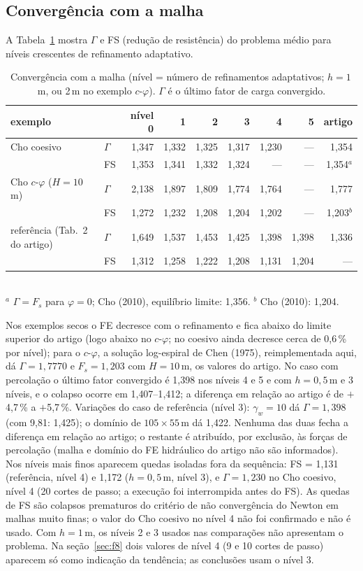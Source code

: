 \documentclass[11pt,a4paper]{article}
\newcommand{\Gam}{\Gamma}
\begin{document}
\subsection{Convergência com a malha}\label{sec:conv}
A Tabela~\ref{tab:conv} mostra $\Gam$ e FS (redução de resistência) do problema médio para níveis crescentes de refinamento adaptativo.
\begin{table}[H]\centering\small\caption{Convergência com a malha (nível = número de refinamentos adaptativos; $h = 1$\,m, ou 2\,m no exemplo $c$-$\varphi$). $\Gam$ é o último fator de carga convergido.}\label{tab:conv}
\begin{tabular}{llrrrrrrr}\toprule exemplo & & nível 0 & 1 & 2 & 3 & 4 & 5 & artigo\\\midrule
Cho coesivo & $\Gam$ & 1{,}347 & 1{,}332 & 1{,}325 & 1{,}317 & 1{,}230 & --- & 1,354\\
 & FS & 1{,}353 & 1{,}341 & 1{,}332 & 1{,}324 & --- & --- & 1,354$^a$\\
Cho $c$-$\varphi$ ($H = 10$\,m) & $\Gam$ & 2{,}138 & 1{,}897 & 1{,}809 & 1{,}774 & 1{,}764 & --- & 1,777\\
 & FS & 1{,}272 & 1{,}232 & 1{,}208 & 1{,}204 & 1{,}202 & --- & 1,203$^b$\\
referência (Tab.~2 do artigo) & $\Gam$ & 1{,}649 & 1{,}537 & 1{,}453 & 1{,}425 & 1{,}398 & 1{,}398 & 1,336\\
 & FS & 1{,}312 & 1{,}258 & 1{,}222 & 1{,}208 & 1{,}131 & 1{,}204 & ---\\
\bottomrule\end{tabular}\\[2pt]{\footnotesize $^a$ $\Gam = F_s$ para $\varphi = 0$; Cho (2010), equilíbrio limite: 1,356. $^b$ Cho (2010): 1,204.}\end{table}
Nos exemplos secos o FE decresce com o refinamento e fica abaixo do limite superior do artigo (logo abaixo no $c$-$\varphi$; no coesivo ainda decresce cerca de 0,6\,\% por nível); para o $c$-$\varphi$, a solução log-espiral de Chen (1975), reimplementada aqui, dá $\Gam = 1{,}7770$ e $F_s = 1{,}203$ com $H = 10$\,m, os valores do artigo. No caso com percolação o último fator convergido é 1{,}398 nos níveis 4 e 5 e com $h = 0{,}5$\,m e 3 níveis, e o colapso ocorre em 1{,}407--1{,}412; a diferença em relação ao artigo é de $+$4{,}7\,\% a $+$5{,}7\,\%.
Variações do caso de referência (nível 3): $\gamma_w = 10$ dá $\Gam = 1{,}398$ (com 9,81: 1{,}425); o domínio de $105 \times 55$\,m dá 1{,}422. Nenhuma das duas fecha a diferença em relação ao artigo; o restante é atribuído, por exclusão, às forças de percolação (malha e domínio do FE hidráulico do artigo não são informados).
Nos níveis mais finos aparecem quedas isoladas fora da sequência: FS = 1{,}131 (referência, nível 4) e 1{,}172 ($h = 0{,}5$\,m, nível 3), e $\Gam = 1{,}230$ no Cho coesivo, nível 4 (20 cortes de passo; a execução foi interrompida antes do FS). As quedas de FS são colapsos prematuros do critério de não convergência do Newton em malhas muito finas; o valor do Cho coesivo no nível 4 não foi confirmado e não é usado. Com $h = 1$\,m, os níveis 2 e 3 usados nas comparações não apresentam o problema. Na seção~\ref{sec:f8} dois valores de nível 4 (9 e 10 cortes de passo) aparecem só como indicação da tendência; as conclusões usam o nível 3.
\end{document}
